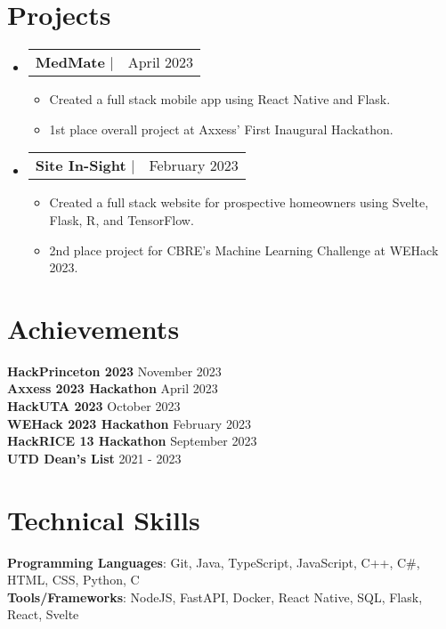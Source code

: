 \documentclass[11pt,letterpaper]{article}%
\makeatletter
\newcommand{\resumeItem}[1]{
  \item\small{
    {#1 \vspace{-2pt}}
  }
}
\newcommand{\resumeProjectHeading}[2]{
    \item
    \begin{tabular*}{0.97\textwidth}{l@{\extracolsep{\fill}}r}
      \small#1 & #2 \\
    \end{tabular*}\vspace{-7pt}
}
\newcommand{\resumeSubHeadingListStart}{\begin{itemize}[leftmargin=0.15in, label={}]}
\newcommand{\resumeSubHeadingListEnd}{\end{itemize}}
\newcommand{\resumeItemListStart}{\begin{itemize}}
\newcommand{\resumeItemListEnd}{\end{itemize}\vspace{-5pt}}
\makeatother
\begin{document}
\section{Projects}
%
    \resumeSubHeadingListStart
%
      \resumeProjectHeading
%
          {\textbf{MedMate} $|$ \emph{}}{April 2023}
%
          \resumeItemListStart
%
            \resumeItem{Created a full stack mobile app using React Native and Flask.}
%
            \resumeItem{1st place overall project at Axxess' First Inaugural Hackathon.}
%
          \resumeItemListEnd
%
      \resumeProjectHeading
%
          {\textbf{Site In{-}Sight} $|$ \emph{}}{February 2023}
%
          \resumeItemListStart
%
            \resumeItem{Created a full stack website for prospective homeowners using Svelte, Flask, R, and TensorFlow.}
%
            \resumeItem{2nd place project for CBRE's Machine Learning Challenge at WEHack 2023.}
%
          \resumeItemListEnd
%
    \resumeSubHeadingListEnd
%
%
\section{Achievements}
%
 \begin{itemize}[leftmargin=0.15in, label={}]
%
    \small{\item{
%
     \textbf{HackPrinceton 2023} \hfill {November 2023} \\
%
     \textbf{Axxess 2023 Hackathon} \hfill {April 2023} \\
%
     \textbf{HackUTA 2023} \hfill {October 2023} \\
%
     \textbf{WEHack 2023 Hackathon} \hfill {February 2023} \\
%
     \textbf{HackRICE 13 Hackathon} \hfill {September 2023} \\
%
     \textbf{UTD Dean's List} \hfill {2021 {-} 2023} \\
%
    }}
%
 \end{itemize}
%
%
\section{Technical Skills}
%
 \begin{itemize}[leftmargin=0.15in, label={}]
%
    \small{\item{
%
     \textbf{Programming Languages}{: Git, Java, TypeScript, JavaScript, C++, C\#, HTML, CSS, Python, C} \\
%
     \textbf{Tools/Frameworks}{: NodeJS, FastAPI, Docker, React Native, SQL, Flask, React, Svelte} \\
%
    }}
%
 \end{itemize}
%
%
\end{document}
